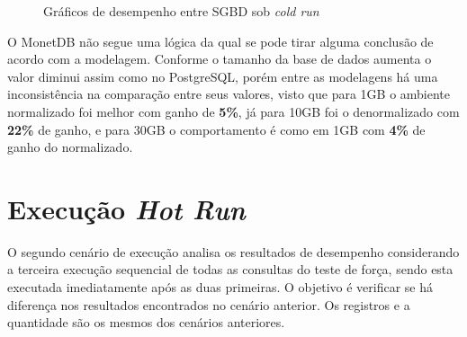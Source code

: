 \begin{figure}[htpb]
        \centering
        \caption{Gráficos de desempenho entre SGBD sob \textit{cold run}}
        \label{fig:qph_sgbd_cold}
\end{figure}

O MonetDB não segue uma lógica da qual se pode tirar alguma conclusão de acordo com a modelagem. Conforme o tamanho da base de dados aumenta o valor diminui assim como no PostgreSQL, porém entre as modelagens há uma inconsistência na comparação entre seus valores, visto que para 1GB o ambiente normalizado foi melhor com ganho de \textbf{5\%}, já para 10GB foi o denormalizado com \textbf{22\%} de ganho, e para 30GB o comportamento é como em 1GB com \textbf{4\%} de ganho do normalizado. 


\section{Execução \textit{Hot Run}}

O segundo cenário de execução analisa os resultados de desempenho considerando a terceira execução sequencial de todas as consultas do teste de força, sendo esta executada imediatamente após as duas primeiras. O objetivo é verificar se há diferença nos resultados encontrados no cenário anterior. Os registros e a quantidade são os mesmos dos cenários anteriores. 

